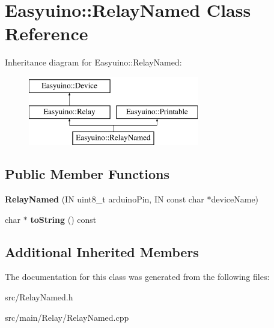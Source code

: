 \hypertarget{class_easyuino_1_1_relay_named}{}\section{Easyuino\+:\+:Relay\+Named Class Reference}
\label{class_easyuino_1_1_relay_named}
Inheritance diagram for Easyuino\+:\+:Relay\+Named\+:\begin{figure}[H]
\begin{center}
\leavevmode
\includegraphics[height=3.000000cm]{class_easyuino_1_1_relay_named}
\end{center}
\end{figure}
\subsection*{Public Member Functions}
\begin{DoxyCompactItemize}
\item 
\mbox{\label{class_easyuino_1_1_relay_named_a3def4eb321085beb48fa3e45da5e6dfc}} 
{\bfseries Relay\+Named} (IN uint8\+\_\+t arduino\+Pin, IN const char $\ast$device\+Name)
\item 
\mbox{\label{class_easyuino_1_1_relay_named_a18b8e73309b77b97cb344f09d5b5fab7}} 
char $\ast$ {\bfseries to\+String} () const
\end{DoxyCompactItemize}
\subsection*{Additional Inherited Members}


The documentation for this class was generated from the following files\+:\begin{DoxyCompactItemize}
\item 
src/Relay\+Named.\+h\item 
src/main/\+Relay/Relay\+Named.\+cpp\end{DoxyCompactItemize}

